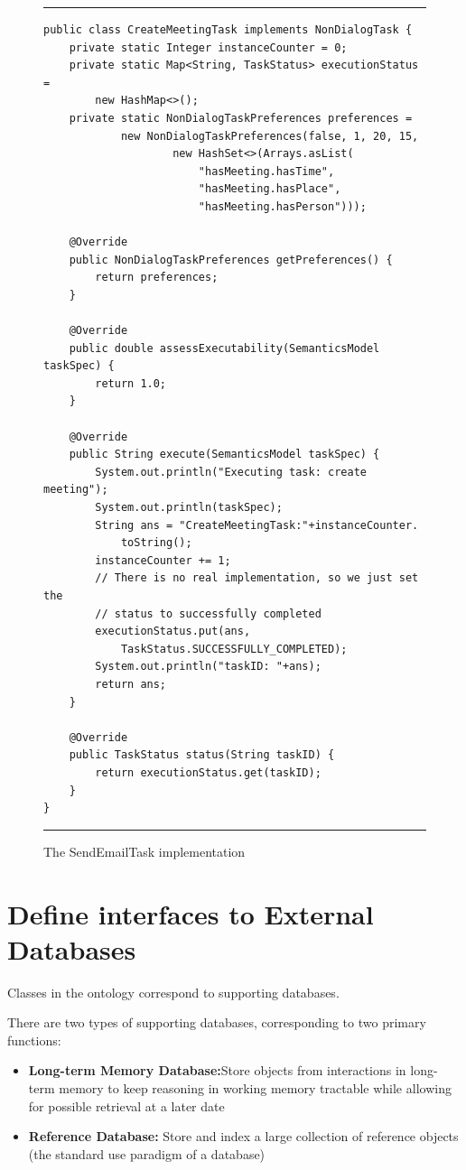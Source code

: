 \documentclass[10pt]{article}
\begin{document}
\begin{figure}[ht*]
\centering
\rule{\textwidth}{1pt}
\small
\begin{verbatim}
public class CreateMeetingTask implements NonDialogTask {
    private static Integer instanceCounter = 0;
    private static Map<String, TaskStatus> executionStatus = 
        new HashMap<>();
    private static NonDialogTaskPreferences preferences =
            new NonDialogTaskPreferences(false, 1, 20, 15,
                    new HashSet<>(Arrays.asList(
                        "hasMeeting.hasTime", 
                        "hasMeeting.hasPlace", 
                        "hasMeeting.hasPerson")));

    @Override
    public NonDialogTaskPreferences getPreferences() {
        return preferences;
    }

    @Override
    public double assessExecutability(SemanticsModel taskSpec) {
        return 1.0;
    }

    @Override
    public String execute(SemanticsModel taskSpec) {
        System.out.println("Executing task: create meeting");
        System.out.println(taskSpec);
        String ans = "CreateMeetingTask:"+instanceCounter.
            toString();
        instanceCounter += 1;
        // There is no real implementation, so we just set the
        // status to successfully completed
        executionStatus.put(ans, 
            TaskStatus.SUCCESSFULLY_COMPLETED);
        System.out.println("taskID: "+ans);
        return ans;
    }

    @Override
    public TaskStatus status(String taskID) {
        return executionStatus.get(taskID);
    }
}
\end{verbatim}
\rule{\textwidth}{1pt}
\caption{The SendEmailTask implementation}
\label{CreateMeetingTask-code-figure}
\end{figure}










\section {Define interfaces to External Databases}
Classes in the ontology correspond to supporting databases.

There are two types of supporting databases, corresponding to two primary functions:
\begin{itemize}
\item{\textbf{Long-term Memory Database:}Store objects from interactions in long-term memory to keep reasoning in working memory tractable while allowing for possible retrieval at a later date}
\item{\textbf{Reference Database:} Store and index a large collection of reference objects (the standard use paradigm of a database)}
\end{itemize}
\end{document}
